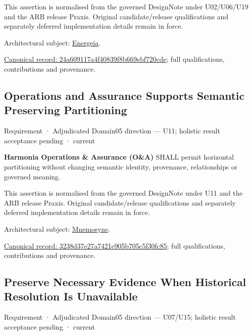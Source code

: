 This assertion is normalised from the governed DesignNote under U02/U06/U19 and the ARB release Praxis. Original candidate/release qualifications and separately deferred implementation details remain in force.



Architectural subject: \hyperref[element:fb3f37a6ac614415ac486a6de9d35994]{Energeia}.


{\footnotesize \href{../../../../continuum/motivation/requirement/24a609117a4f40839f8b669ebf720cde.md}{Canonical record: 24a609117a4f40839f8b669ebf720cde}; full qualifications, contributions and provenance.}\par
\subsection{Operations and Assurance Supports Semantic Preserving Partitioning}

\label{element:3238d37e27a7421e905b705c5f30fc85}
{\small Requirement · Adjudicated Domain05 direction — U11; holistic result acceptance pending · current}\par

\textbf{Harmonia Operations \& Assurance (O\&A)} SHALL permit horizontal partitioning without changing semantic identity, provenance, relationships or governed meaning.



This assertion is normalised from the governed DesignNote under U11 and the ARB release Praxis. Original candidate/release qualifications and separately deferred implementation details remain in force.



Architectural subject: \hyperref[element:7985e647bf9e4ca3ba70faf9e3e4ae02]{Mnemosyne}.


{\footnotesize \href{../../../../continuum/motivation/requirement/3238d37e27a7421e905b705c5f30fc85.md}{Canonical record: 3238d37e27a7421e905b705c5f30fc85}; full qualifications, contributions and provenance.}\par
\subsection{Preserve Necessary Evidence When Historical Resolution Is Unavailable}

\label{element:81ce6a25725e41bb8e92c945f53c8b4c}
{\small Requirement · Adjudicated Domain05 direction — U07/U15; holistic result acceptance pending · current}\par

